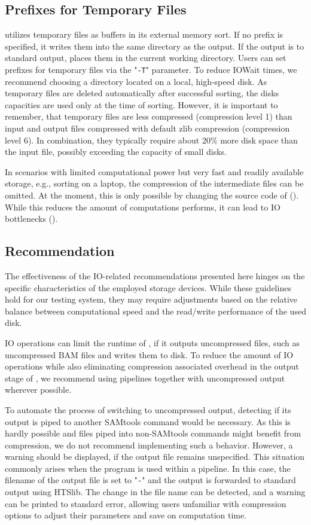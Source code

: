 \subsection{Prefixes for Temporary Files}
 \sort utilizes temporary files as buffers in its external memory sort. If no prefix is specified, it writes them into the same directory as the output. If the output is to standard output, \sort places them in the current working directory. Users can set prefixes for temporary files via the "\texttt{-T}" parameter. To reduce IOWait times, we recommend choosing a directory located on a local, high-speed disk. As temporary files are deleted automatically after successful sorting, the disks capacities are used only at the time of sorting. However, it is important to remember, that temporary files are less compressed (compression level 1) than input and output files compressed with default zlib compression (compression level 6). In combination, they typically require about 20\% more disk space than the input file, possibly exceeding the capacity of small disks.
 
 In scenarios with limited computational power but very fast and readily available storage, e.g., sorting on a laptop, the compression of the intermediate files can be omitted. At the moment, this is only possible by changing the source code of \sort (). While this reduces the amount of computations \sort performs, it can lead to IO bottlenecks ().

\subsection{Recommendation}
The effectiveness of the IO-related recommendations presented here hinges on the specific characteristics of the employed storage devices. While these guidelines hold for our testing system, they may require adjustments based on the relative balance between computational speed and the read/write performance of the used disk.  

IO operations can limit the runtime of \sort, if it outputs uncompressed files, such as uncompressed BAM files and writes them to disk.
To reduce the amount of IO operations while also eliminating compression associated overhead in the output stage of \sort, we recommend using pipelines together with uncompressed output wherever possible.

To automate the process of \sort switching to uncompressed output, detecting if its output is piped to another SAMtools command would be necessary. As this is hardly possible and files piped into non-SAMtools commands might benefit from compression, we do not recommend implementing such a behavior. However, a warning should be displayed, if the output file remains unspecified. This situation commonly arises when the program is used within a pipeline. In this case, the filename of the output file is set to "\texttt{-}" and the output is forwarded to standard output using HTSlib. The change in the file name can be detected, and a warning can be printed to standard error, allowing users unfamiliar with compression options to adjust their parameters and save on computation time.

